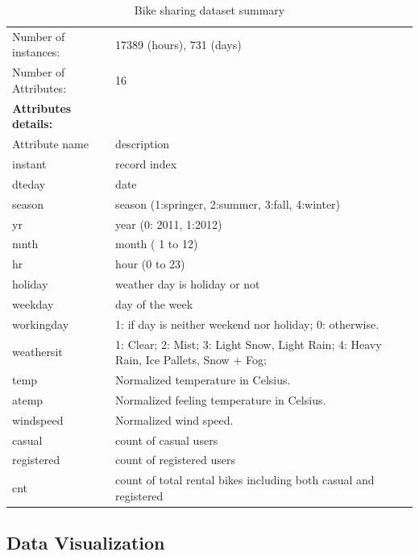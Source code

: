 \documentclass[12pt]{article}
\begin{document}
 \begin{table}[H]
 	\label{table:dataset}
 	\begin{tabular}{| l | p{11cm} |} \hline
 		Number of instances: & 17389 (hours), 731 (days)\\
 		Number of Attributes: & 16\\ \hline \hline
 		\textbf{Attributes details:} &\\ \hline
 		Attribute name  & description\\ \hline
 		instant   & record index\\ \hline
 		dteday    & date\\ \hline
 		season  & season (1:springer, 2:summer, 3:fall, 4:winter)\\ \hline
 		yr    &  year (0: 2011, 1:2012)\\ \hline
 		mnth &   month ( 1 to 12)\\ \hline
 		hr & hour (0 to 23) \\ \hline
 		holiday   & weather day is holiday or not \\ \hline
 		weekday   &  day of the week \\ \hline
 		workingday   & 1: if day is neither weekend nor holiday; 0: otherwise.\\ \hline
 		weathersit   & 1: Clear; 2: Mist; 3: Light Snow, Light Rain; 4: Heavy Rain, Ice Pallets, Snow + Fog;\\ \hline
 		temp   & Normalized temperature in Celsius. \\ \hline
 		atemp    & Normalized feeling temperature in Celsius. \\ \hline
 		windspeed   & Normalized wind speed. \\ \hline
 		casual   & count of casual users\\ \hline
 		registered   & count of registered users\\ \hline
 		cnt   & count of total rental bikes including both casual and registered \\ \hline
 	\end{tabular}
 	\caption{Bike sharing dataset summary}
 \end{table}
\subsection{Data Visualization}
\label{sec:visual}
\end{document}
